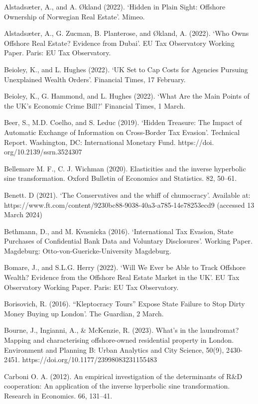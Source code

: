 \documentclass{article}
\begin{document}
\begin{thebibliography}{x}
\bibitem{}
Alstadsæter, A., and A. Økland (2022). ‘Hidden in Plain Sight: Offshore Ownership of Norwegian Real Estate’. Mimeo.

\bibitem{}
Alstadsæter, A., G. Zucman, B. Planterose, and Økland, A. (2022). ‘Who Owns Offshore Real Estate? Evidence from Dubai’. EU Tax Observatory Working Paper. Paris: EU Tax Observatory.

\bibitem{}
Beioley, K., and L. Hughes (2022). ‘UK Set to Cap Costs for Agencies Pursuing Unexplained Wealth Orders’. Financial Times, 17 February.

\bibitem{}
Beioley, K., G. Hammond, and L. Hughes (2022). ‘What Are the Main Points of the UK’s Economic Crime Bill?’ Financial Times, 1 March.

\bibitem{}
Beer, S., M.D. Coelho, and S. Leduc (2019). ‘Hidden Treasure: The Impact of Automatic Exchange of Information on Cross-Border Tax Evasion’. Technical Report. Washington, DC: International Monetary Fund. https://doi. org/10.2139/ssrn.3524307

\bibitem{}
Bellemare M. F., C. J. Wichman (2020). Elasticities and the inverse hyperbolic sine transformation. Oxford Bulletin of Economics and Statistics. 82, 50–61.

\bibitem{}
Benett. D (2021). ‘The Conservatives and the whiff of chumocracy’. Available at: https://www.ft.com/content/9230bc88-9038-40a3-a785-14e78253ecd9 (accessed 13 March 2024)

\bibitem{}
Bethmann, D., and M. Kvasnicka (2016). ‘International Tax Evasion, State Purchases of Confidential Bank Data and Voluntary Disclosures’. Working Paper. Magdeburg: Otto-von-Guericke-University Magdeburg.

\bibitem{}
Bomare, J., and S.L.G. Herry (2022). ‘Will We Ever be Able to Track Offshore Wealth? Evidence from the Offshore Real Estate Market in the UK’. EU Tax Observatory Working Paper. Paris: EU Tax Observatory.

\bibitem{}
Borisovich, R. (2016). “Kleptocracy Tours” Expose State Failure to Stop Dirty Money Buying up London’. The Guardian, 2 March.

\bibitem{}
Bourne, J., Ingianni, A., & McKenzie, R. (2023). What’s in the laundromat? Mapping and characterising offshore-owned residential property in London. Environment and Planning B: Urban Analytics and City Science, 50(9), 2430-2451. https://doi.org/10.1177/23998083231155483

\bibitem{}
Carboni O. A. (2012). An empirical investigation of the determinants of R&D cooperation: An application of the inverse hyperbolic sine transformation. Research in Economics. 66, 131–41.


\end{thebibliography}
\end{document}
